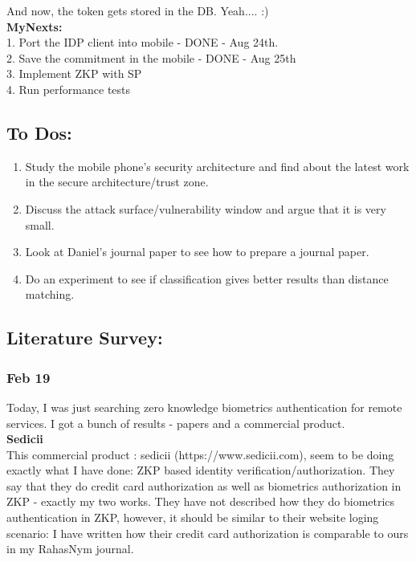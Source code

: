 \documentclass[11pt]{article}
\begin{document}
And now, the token gets stored in the DB. Yeah.... :)\\




\textbf{MyNexts:}\\
 1. Port the IDP client into mobile - DONE - Aug 24th.\\
 2. Save the commitment in the mobile - DONE - Aug 25th\\
 3. Implement ZKP with SP\\
 4. Run performance tests\\


\pagebreak
\subsection*{To Dos:}
\begin{enumerate}
 \item Study the mobile phone's security architecture and find about the latest work in the secure architecture/trust zone.
 \item Discuss the attack surface/vulnerability window and argue that it is very small.
 \item Look at Daniel's journal paper to see how to prepare a journal paper.
 \item Do an experiment to see if classification gives better results than distance matching.
\end{enumerate}

\subsection*{Literature Survey:}
\subsubsection*{Feb 19}
Today, I was just searching zero knowledge biometrics authentication for remote services. I got a bunch of results - papers and a commercial
product.\\
\textbf{Sedicii}\\
This commercial product : sedicii (https://www.sedicii.com), seem to be doing exactly what I have done: ZKP based identity verification/authorization.
They say that they do credit card authorization as well as biometrics authorization in ZKP - exactly my two works.
They have not described how they do biometrics authentication in ZKP, however, it should be similar to their website loging scenario:
I have written how their credit card authorization is comparable to ours in my RahasNym journal.
\pagebreak
\end{document}
